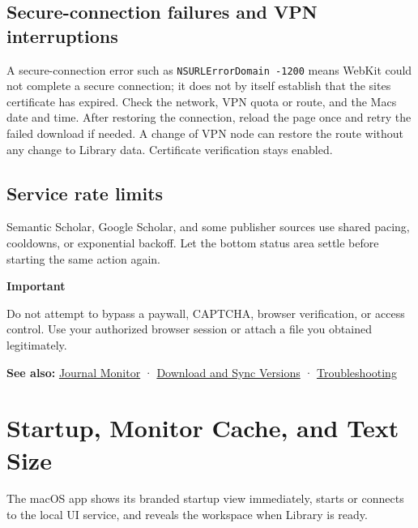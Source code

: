 \documentclass[10pt,letterpaper,oneside]{scrreprt}
\newenvironment{GewuRelated}{\par\nobreak\vspace{3pt}\nobreak\begingroup\small\sffamily\begin{samepage}\noindent}{\par\end{samepage}\endgroup}
\newenvironment{GewuLead}
  {\begin{list}{}{\leftmargin=0pt\rightmargin=0pt\topsep=0pt\partopsep=0pt\parsep=0pt}\item\relax
    \sffamily\fontsize{10.5}{13.2}\selectfont\color{GewuMuted}}
  {\end{list}}
\renewenvironment{quote}
  {\Needspace{5\baselineskip}\begin{tcolorbox}[enhanced,breakable,colback=GewuPale,colframe=GewuPale,boxrule=0pt,
    borderline west={1.6pt}{0pt}{GewuBlue},arc=1.2mm,left=2.5mm,right=2.5mm,top=1.7mm,bottom=1.7mm,
    before skip=4pt,after skip=5pt,fontupper=\color{GewuInk}\small]}
  {\end{tcolorbox}}
\begin{document}
\section{Secure-connection failures and VPN interruptions}\label{secure-connection-failures-and-vpn-interruptions}

A secure-connection error such as \texttt{NSURLErrorDomain\ -1200} means WebKit could not complete a secure connection; it does not by itself establish that the site\textquotesingle s certificate has expired. Check the network, VPN quota or route, and the Mac\textquotesingle s date and time. After restoring the connection, reload the page once and retry the failed download if needed. A change of VPN node can restore the route without any change to Library data. Certificate verification stays enabled.

\section{Service rate limits}\label{service-rate-limits}

Semantic Scholar, Google Scholar, and some publisher sources use shared pacing, cooldowns, or exponential backoff. Let the bottom status area settle before starting the same action again.

\begin{quote}
\textbf{Important}

Do not attempt to bypass a paywall, CAPTCHA, browser verification, or access control. Use your authorized browser session or attach a file you obtained legitimately.
\end{quote}

\begin{GewuRelated}
\textbf{See also:} \hyperref[journal-monitor]{Journal Monitor} · \hyperref[download-sync]{Download and Sync Versions} · \hyperref[troubleshooting]{Troubleshooting}
\end{GewuRelated}

\chapter{Startup, Monitor Cache, and Text Size}\label{startup}

\begin{GewuLead}
The macOS app shows its branded startup view immediately, starts or connects to the local UI service, and reveals the workspace when Library is ready.
\end{GewuLead}
\end{document}
